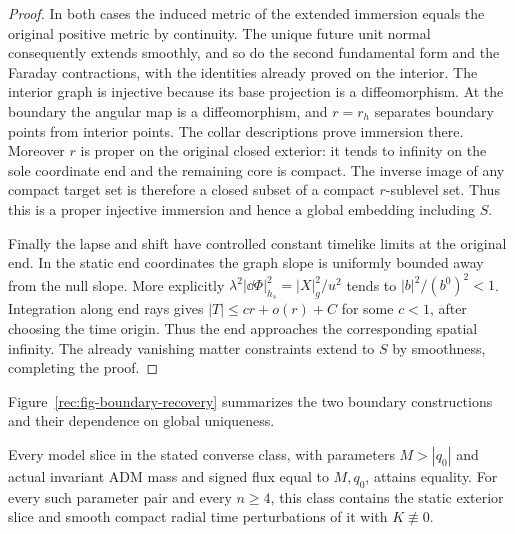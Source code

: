 \begin{proof}
In both cases the induced metric of the extended immersion equals
the original positive metric by continuity. The unique future unit
normal consequently extends smoothly, and so do the second
fundamental form and the Faraday contractions, with the identities
already proved on the interior. The interior graph is injective because its base projection is a
diffeomorphism. At the boundary the angular map is a diffeomorphism,
and $r=r_h$ separates boundary points from interior points. The
collar descriptions prove immersion there. Moreover $r$ is proper
on the original closed exterior: it tends to infinity on the sole
coordinate end and the remaining core is compact. The inverse
image of any compact target set is therefore a closed subset of
a compact $r$-sublevel set. Thus this is a proper injective
immersion and hence a global embedding including $S$.

Finally the lapse and shift have controlled constant timelike limits
at the original end. In the static end coordinates the graph
slope is uniformly bounded away from the null slope. More
explicitly $\lambda^2|\dd\Phi|_{h_s}^2=|X|_g^2/u^2$ tends
to $|b|^2/(b^0)^2<1$. Integration along end rays gives
$|T|\leq c r+o(r)+C$ for some $c<1$, after choosing the time
origin. Thus the end approaches the corresponding spatial
infinity. The already vanishing matter constraints extend to $S$
by smoothness, completing the proof.
\end{proof}

Figure~\ref{rec:fig-boundary-recovery} summarizes the two boundary
constructions and their dependence on global uniqueness.


\begin{proposition}\label{rec:sharpness}
Every model slice in the stated converse class, with parameters
$M>|q_0|$ and actual invariant ADM mass and signed flux equal to
$M,q_0$, attains equality. For every such parameter pair and every
$n\geq4$, this class contains the static exterior slice and smooth
compact radial time perturbations of it with $K\not\equiv0$.
\end{proposition}

